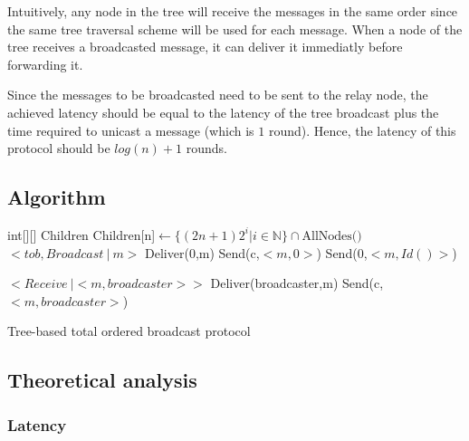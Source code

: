 \documentclass[a4paper]{article}
\begin{document}
Intuitively, any node in the tree will receive the messages in the same order
since the same tree traversal scheme will be used for each message. When a
node of the tree receives a broadcasted message, it can deliver it immediatly
before forwarding it.

Since the messages to be broadcasted need to be sent to the relay node, the
achieved latency should be equal to the latency of the tree broadcast plus
the time required to unicast a message (which is $1$ round). Hence, the
latency of this protocol should be $log(n) + 1$ rounds.

\subsection{Algorithm}
\begin{algorithm}[H]
    \centering
    \begin{algorithmic}[5]
        \Data
        \State int[][] Children
        \EndData
        \Init
        \State Children[n]$\gets\{(2n + 1)2^i | i \in \mathbb{N}\} \cap \text{AllNodes()}$
        \EndFor
        \EndInit
        \Event $< tob,Broadcast\ |\ m> $
        \State Deliver(0,m)
        \State Send(c,$<m,0>$)
        \EndFor
        \Else
        \State Send(0,$<m,Id()>$)
        \EndIf
        \EndEvent

        \Event $<Receive\ | <m,broadcaster>>$
        \State Deliver(broadcaster,m)
        \State Send(c,$<m,broadcaster>$)
        \EndFor
        \EndEvent
    \end{algorithmic}
    \caption{Tree-based total ordered broadcast protocol}
\end{algorithm}

\subsection{Theoretical analysis}

\subsubsection*{Latency}
\end{document}
